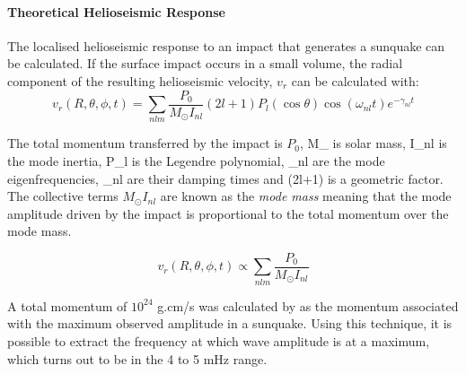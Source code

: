 {\paragraph{Theoretical Helioseismic Response}\label{helioresp}
The localised helioseismic response to an impact that generates a sunquake can be calculated. If the surface impact occurs in a small volume, the radial component of the resulting helioseismic velocity, $v_r$ can be calculated with:
\begin{equation}
v_{r}(R, \theta, \phi, t) = \sum_{nlm} \frac{P_{0}}{M_{\odot}I_{nl}}(2l+1)P_{l}(\cos\theta)\cos(\omega_{nl}t)e^{-\gamma_{nl}t}
\end{equation}

The total momentum transferred by the impact is $P_{0}$, M_{\odot} is solar mass, I_{nl} is the mode inertia, P_{l} is the Legendre polynomial, \omega_{nl} are the mode eigenfrequencies, \gamma_{nl} are their damping times and (2l+1) is a geometric factor. The collective terms $M_{\odot}I_{nl}$ are known as the \emph{mode mass} meaning that the mode amplitude driven by the impact is proportional to the total momentum over the mode mass.    

\begin{equation}
v_{r}(R, \theta, \phi, t) \propto \sum_{nlm} \frac{P_{0}}{M_{\odot}I_{nl}}
\end{equation}

A total momentum of $10^{24}$ g.cm/s was calculated by \cite{2009AIPC.1170..547K} as the momentum associated with the maximum observed amplitude in a sunquake. Using this technique, it is possible to extract the frequency at which wave amplitude is at a maximum, which turns out to be in the 4 to 5 mHz range.

}
